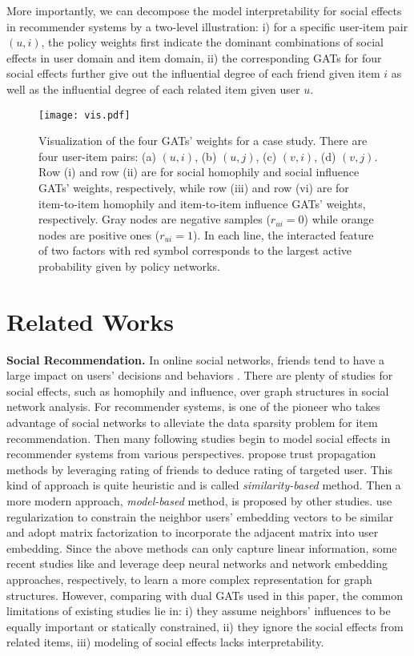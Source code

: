 \documentclass[sigconf]{acmart}
\begin{document}
More importantly, we can decompose the model interpretability for social effects in recommender systems by a two-level illustration: i) for a specific user-item pair $(u,i)$, the policy weights first indicate the dominant combinations of social effects in user domain and item domain, ii) the corresponding GATs for four social effects further give out the influential degree of each friend given item $i$ as well as the influential degree of each related item given user $u$.

\begin{figure}[h]
	\centering
	\texttt{[image: vis.pdf]}
	\caption{Visualization of the four GATs' weights for a case study. There are four user-item pairs: (a) $(u,i)$, (b) $(u,j)$, (c) $(v,i)$, (d) $(v,j)$. Row (i) and row (ii) are for social homophily and social influence GATs' weights, respectively, while row (iii) and row (vi) are for item-to-item homophily and item-to-item influence GATs' weights, respectively. Gray nodes are negative samples ($r_{ui}=0$) while orange nodes are positive ones ($r_{ui}=1$). In each line, the interacted feature of two factors with red symbol corresponds to the largest active probability given by policy networks.}
	\label{fig-vis} 
	\vspace{-10pt}
\end{figure}

\section{Related Works}

\textbf{Social Recommendation.} In online social networks, friends tend to have a large impact on users' decisions and behaviors \cite{diffuse1, diffuse2}. There are plenty of studies for social effects, such as homophily\cite{Homophily} and influence\cite{Influence}, over graph structures in social network analysis. For recommender systems, \cite{earliest} is one of the pioneer who takes advantage of social networks to alleviate the data sparsity problem for item recommendation. Then many following studies begin to model social effects in recommender systems from various perspectives. \cite{Trust1,Trust2,Trust3} propose trust propagation methods by leveraging rating of friends to deduce rating of targeted user. This kind of approach is quite heuristic and is called \emph{similarity-based} method. Then a more modern approach, \emph{model-based} method, is proposed by other studies. \cite{SocReg,SocialMF} use regularization to constrain the neighbor users' embedding vectors to be similar and \cite{MF1,MF2,TrustMF} adopt matrix factorization to incorporate the adjacent matrix into user embedding. Since the above methods can only capture linear information, some recent studies like \cite{Deep1,NSCR} and \cite{SREPS,NetRep1,DBLP:conf/cikm/ZhangLNLX18} leverage deep neural networks and network embedding approaches, respectively, to learn a more complex representation for graph structures. However, comparing with dual GATs used in this paper, the common limitations of existing studies lie in: i) they assume neighbors' influences to be equally important or statically constrained, ii) they ignore the social effects from related items, iii) modeling of social effects lacks interpretability.
\end{document}
